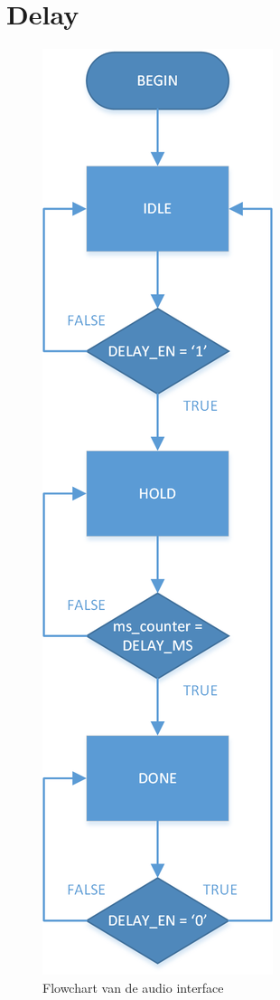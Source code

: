 \newpage
\section{Delay}
\label{sec:appDelay}
	\begin{figure}[H]
		\centering
		\includegraphics[height=0.85\textheight]{Appendix/FlowCharts/Delay}
		\caption{Flowchart van de audio interface}
		\label{fig:FlowChartDelay}
	\end{figure}


